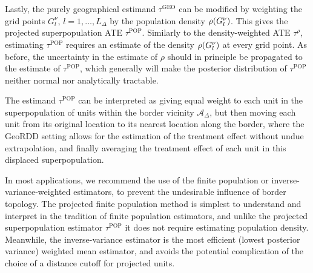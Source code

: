\documentclass[letter,12pt]{article}
\DeclarePairedDelimiter{\parenthesis}{\lparen}{\rparen}
\newcommand{\del}[1]{\parenthesis*{#1}}
\newcommand{\area}{\mathcal{A}}
\newcommand{\taurho}{\tau^{\rho}}
\newcommand{\taugeo}{\tau^{\mathrm{GEO}}}
\newcommand{\taupop}{\tau^{\mathrm{POP}}}
\newcommand{\buffer}{\Delta}
\newcommand{\gridres}{\nu}
\newcommand{\grid}{G^\gridres}
\begin{document}
Lastly, the purely geographical estimand \(\taugeo\) can be modified by weighting the grid points \(\grid_l\), \(l=1,\dotsc,L_\buffer\) by the population density \(\rho\del{\grid_l}\).
This gives the projected superpopulation ATE \(\taupop\).
Similarly to the density-weighted ATE \(\taurho\), estimating \(\taupop\) requires an estimate of the density \(\rho\del{\grid_l}\) at every grid point.
As before, the uncertainty in the estimate of \(\rho\) should in principle be propagated to the estimate of \(\taupop\), which generally will make the posterior distribution of \(\taupop\) neither normal nor analytically tractable.

The estimand \(\taupop\) can be interpreted as giving equal weight to each unit in the superpopulation of units within the border vicinity \(\area_\buffer\), but then moving each unit from its original location to its nearest location along the border, where the GeoRDD setting allows for the estimation of the treatment effect without undue extrapolation, and finally averaging the treatment effect of each unit in this displaced superpopulation.




In most applications, we recommend the use of the finite population or inverse-variance-weighted estimators, to prevent the undesirable influence of border topology.
The projected finite population method is simplest to understand and interpret in the tradition of finite population estimators, and unlike the projected superpopulation estimator \(\taupop\) it does not require estimating population density.
Meanwhile, the inverse-variance estimator is the most efficient (lowest posterior variance) weighted mean estimator,
and avoids the potential complication of the choice of a distance cutoff for projected units.
\end{document}
